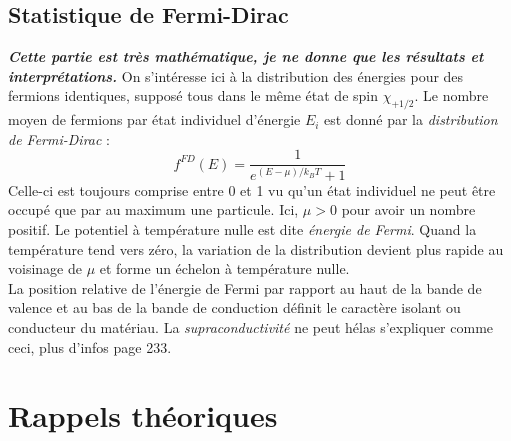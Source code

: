 \documentclass	[11pt, a4paper, openany]{book}
\begin{document}
		\section{Statistique de Fermi-Dirac}
		\textit{\textbf{Cette partie est très mathématique, je ne donne que les résultats et interprétations.}}
		On s'intéresse ici à la distribution des énergies pour des fermions identiques, supposé tous dans le 
		même état de spin $\chi_{+1/2}$. Le nombre moyen de fermions par état individuel d'énergie $E_i$ est 
		donné par la \textit{distribution de Fermi-Dirac} :
		\begin{equation}
			f^{FD}(E) = \frac{1}{e^{(E-\mu)/k_BT}+1}
		\end{equation}
		Celle-ci est toujours comprise entre 0 et 1 vu qu'un état individuel ne peut être occupé que par au 
		maximum une particule. Ici, $\mu > 0$ pour avoir un nombre positif. Le potentiel à température nulle 
		est dite \textit{énergie de Fermi}. Quand la température tend vers zéro, la variation de la distribution
		devient plus rapide au voisinage de $\mu$ et forme un échelon à température nulle. \\
		La position relative de l'énergie de Fermi par rapport au haut de la bande de valence et au bas de la bande
		de conduction définit le caractère isolant ou conducteur du matériau. La \textit{supraconductivité} ne peut 
		hélas s'expliquer comme ceci, plus d'infos page 233.
		
		
		
		
		
		\appendix
		\chapter{Rappels théoriques}
		
		
		
		
		
		
		
		
		
		
		
		
		
		
		
		
		
		
		
		
		
			
\end{document}

